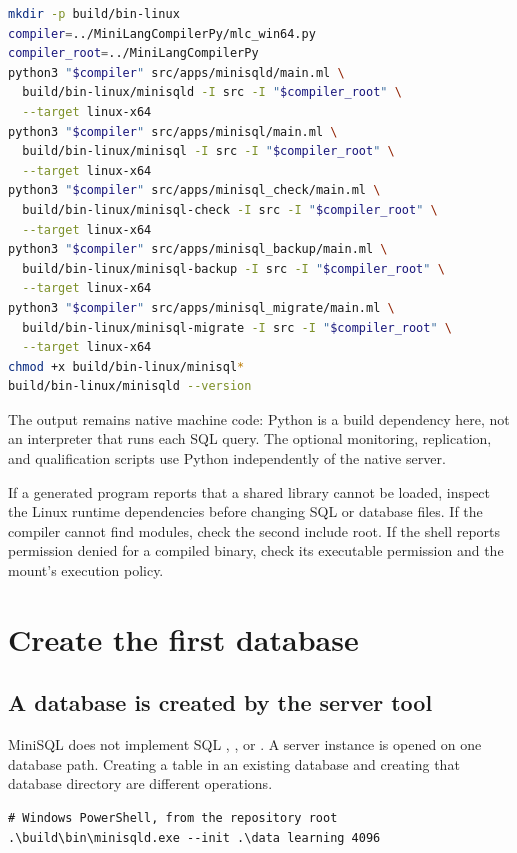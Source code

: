 \begin{lstlisting}[language=bash]
mkdir -p build/bin-linux
compiler=../MiniLangCompilerPy/mlc_win64.py
compiler_root=../MiniLangCompilerPy
python3 "$compiler" src/apps/minisqld/main.ml \
  build/bin-linux/minisqld -I src -I "$compiler_root" \
  --target linux-x64
python3 "$compiler" src/apps/minisql/main.ml \
  build/bin-linux/minisql -I src -I "$compiler_root" \
  --target linux-x64
python3 "$compiler" src/apps/minisql_check/main.ml \
  build/bin-linux/minisql-check -I src -I "$compiler_root" \
  --target linux-x64
python3 "$compiler" src/apps/minisql_backup/main.ml \
  build/bin-linux/minisql-backup -I src -I "$compiler_root" \
  --target linux-x64
python3 "$compiler" src/apps/minisql_migrate/main.ml \
  build/bin-linux/minisql-migrate -I src -I "$compiler_root" \
  --target linux-x64
chmod +x build/bin-linux/minisql*
build/bin-linux/minisqld --version
\end{lstlisting}

The output remains native machine code: Python is a build dependency here,
not an interpreter that runs each SQL query. The optional monitoring,
replication, and qualification scripts use Python independently of the native
server.

If a generated program reports that a shared library cannot be loaded,
inspect the Linux runtime dependencies before changing SQL or database files.
If the compiler cannot find  modules, check the second include root.
If the shell reports permission denied for a compiled binary, check its
executable permission and the mount's execution policy.

\section{Create the first database}

\subsection{A database is created by the server tool}

MiniSQL does not implement SQL \code{CREATE DATABASE}, ,
or \code{USE}. A server instance is opened on one database path. Creating a
table in an existing database and creating that database directory are
different operations.

\begin{lstlisting}
# Windows PowerShell, from the repository root
.\build\bin\minisqld.exe --init .\data learning 4096
\end{lstlisting}

